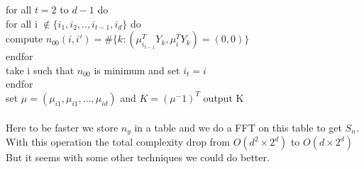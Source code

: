 \documentclass{article}
\begin{document}
for all $t=2$ to $d-1$ do\\
for all i $\notin \{i_1,i_2,..,i_{t-1},i_d\}$ do\\
compute $n_{00}(i,i{'})=\#\{k:(\mu^{T}_{i_{t-1}}Y_{k},\mu^{T}_{i}Y_{k})=(0,0)\}$\\
endfor\\
take i such that $n_{00}$ is minimum and set $i_t=i$\\
endfor\\
set $\mu = (\mu_{i1},\mu_{i1},...,\mu_{id})$ and $K=(\mu^-1)^T$
output K\\
\\
Here to be faster we store $n_y$ in a table and we do a FFT on this table to get $S_n$. With this operation the total complexity drop from $O(d^2 \times 2^d)$ to $O(d \times 2^d)$
But it seems with some other techniques we could do better.
\end{document}

